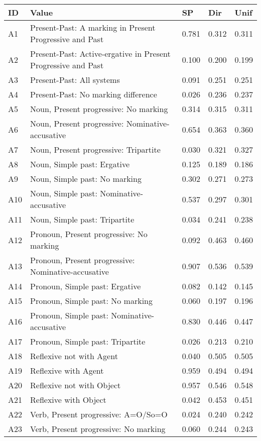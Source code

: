 \begin{longtable}{lllll}
\toprule
ID & Value & SP & Dir & Unif\\
\midrule
A1 & Present-Past: A marking in Present Progressive and Past & 0.781 & 0.312 & 0.311\\
A2 & Present-Past: Active-ergative in Present Progressive and Past & 0.100 & 0.200 & 0.199\\
A3 & Present-Past: All systems & 0.091 & 0.251 & 0.251\\
A4 & Present-Past: No marking difference & 0.026 & 0.236 & 0.237\\
A5 & Noun, Present progressive: No marking & 0.314 & 0.315 & 0.311\\
A6 & Noun, Present progressive: Nominative-accusative & 0.654 & 0.363 & 0.360\\
A7 & Noun, Present progressive: Tripartite & 0.030 & 0.321 & 0.327\\
A8 & Noun, Simple past: Ergative & 0.125 & 0.189 & 0.186\\
A9 & Noun, Simple past: No marking & 0.302 & 0.271 & 0.273\\
A10 & Noun, Simple past: Nominative-accusative & 0.537 & 0.297 & 0.301\\
A11 & Noun, Simple past: Tripartite & 0.034 & 0.241 & 0.238\\
A12 & Pronoun, Present progressive: No marking & 0.092 & 0.463 & 0.460\\
A13 & Pronoun, Present progressive: Nominative-accusative & 0.907 & 0.536 & 0.539\\
A14 & Pronoun, Simple past: Ergative & 0.082 & 0.142 & 0.145\\
A15 & Pronoun, Simple past: No marking & 0.060 & 0.197 & 0.196\\
A16 & Pronoun, Simple past: Nominative-accusative & 0.830 & 0.446 & 0.447\\
A17 & Pronoun, Simple past: Tripartite & 0.026 & 0.213 & 0.210\\
A18 & Reflexive not with Agent & 0.040 & 0.505 & 0.505\\
A19 & Reflexive with Agent & 0.959 & 0.494 & 0.494\\
A20 & Reflexive not with Object & 0.957 & 0.546 & 0.548\\
A21 & Reflexive with Object & 0.042 & 0.453 & 0.451\\
A22 & Verb, Present progressive: A=O/So=O & 0.024 & 0.240 & 0.242\\
A23 & Verb, Present progressive: No marking & 0.060 & 0.244 & 0.243\\

\end{longtable}
